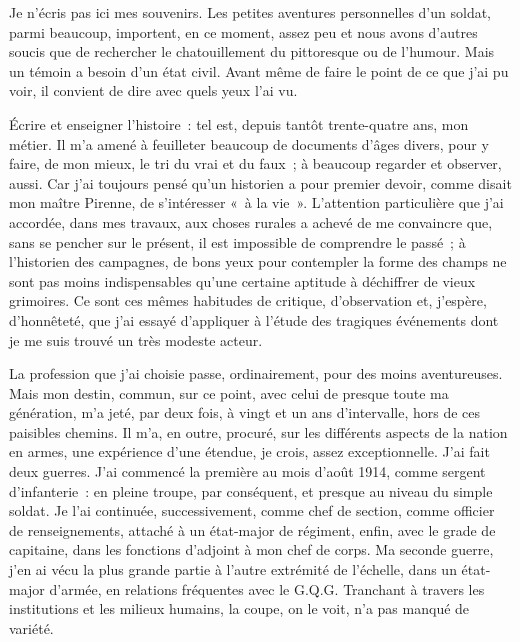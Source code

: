 \documentclass[french,twoside]{book} %
\begin{document}
\noindent Je n’écris pas ici mes souvenirs. Les petites aventures personnelles d’un soldat, parmi beaucoup, importent, en ce moment, assez peu et nous avons d’autres soucis que de rechercher le chatouillement du pittoresque ou de l’humour. Mais un témoin a besoin d’un état civil. Avant même de faire le point   de ce que j’ai pu voir, il convient de dire avec quels yeux l’ai vu.\par
Écrire et enseigner l’histoire : tel est, depuis tantôt trente-quatre ans, mon métier. Il m’a amené à feuilleter beaucoup de documents d’âges divers, pour y faire, de mon mieux, le tri du vrai et du faux ; à beaucoup regarder et observer, aussi. Car j’ai toujours pensé qu’un historien a pour premier devoir, comme disait mon maître Pirenne, de s’intéresser « à la vie ». L’attention particulière que j’ai accordée, dans mes travaux, aux choses rurales a achevé de me convaincre que, sans se pencher sur le présent, il est impossible de comprendre le passé ; à l’historien des campagnes, de bons yeux pour contempler la forme des champs ne sont pas moins indispensables qu’une certaine aptitude à déchiffrer de vieux grimoires. Ce sont ces mêmes habitudes de critique, d’observation et, j’espère, d’honnêteté, que j’ai essayé d’appliquer à l’étude des tragiques événements dont je me suis trouvé un très modeste acteur.\par
La profession que j’ai choisie passe, ordinairement, pour des moins aventureuses. Mais mon destin, commun, sur ce point, avec celui de presque toute ma génération, m’a jeté, par deux fois, à vingt et un ans d’intervalle, hors de ces paisibles chemins. Il m’a, en outre, procuré, sur les différents aspects de la nation en armes, une expérience d’une étendue, je crois, assez exceptionnelle. J’ai fait deux guerres. J’ai commencé la première au mois d’août 1914, comme sergent d’infanterie : en pleine troupe, par conséquent, et presque au niveau du simple soldat. Je l’ai continuée, successivement, comme chef de section, comme officier de renseignements, attaché à un état-major de régiment, enfin, avec le grade de capitaine, dans les fonctions d’adjoint à mon chef de corps. Ma seconde guerre, j’en ai vécu la plus grande partie à l’autre extrémité de l’échelle, dans un état-major d’armée, en relations fréquentes   avec le G.Q.G. Tranchant à travers les institutions et les milieux humains, la coupe, on le voit, n’a pas manqué de variété.\par
\end{document}
